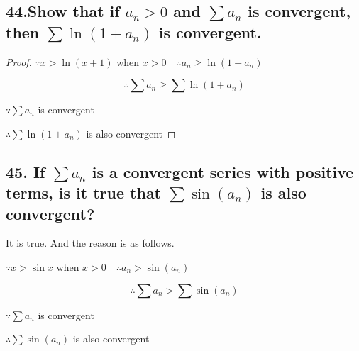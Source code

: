 \documentclass{article}
\begin{document}
    \subsection*{44.Show that if $a_n > 0$ and $\sum a_n$ is convergent, then $\sum \ln(1 + a_n )$ is convergent.}

    \begin{proof}
        $\because x > \ln (x+1)$ when $x > 0 \quad \therefore a_n \geq \ln (1+a_n)$

        $$\therefore \sum a_n \geq \sum \ln(1+a_n)$$

        $\because \sum a_n$ is convergent

        $\therefore \sum \ln (1+a_n)$ is also convergent
    \end{proof}

    \subsection*{45. If $\sum a_n$ is a convergent series with positive terms, is it true that $\sum \sin (a_n)$ is also convergent?}

    It is true. And the reason is as follows.

    $\because x > \sin x$ when $x > 0 \quad \therefore a_n > \sin (a_n)$

    $$\therefore \sum a_n > \sum \sin (a_n)$$

    $\because \sum a_n$ is convergent

    $\therefore \sum \sin (a_n)$ is also convergent
    
    
\end{document}
